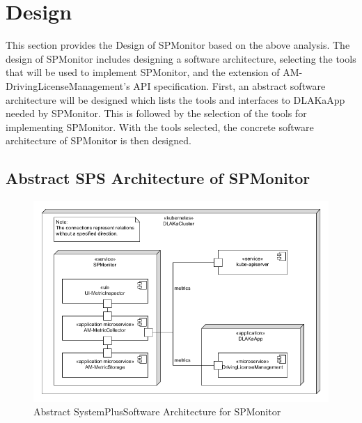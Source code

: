 \section{Design}
\label{sec:design}

This section provides the Design of SPMonitor based on the above analysis.
The design of SPMonitor includes designing a software architecture,
selecting the tools that will be used to implement SPMonitor, and
the extension of AM-DrivingLicenseManagement's API specification.
First, an abstract software architecture will be designed which lists
the tools and interfaces to DLAKaApp needed by SPMonitor.
This is followed by the selection of the tools for implementing SPMonitor.
With the tools selected, the concrete software architecture of SPMonitor is then designed.

\subsection{Abstract SPS Architecture of SPMonitor}

\begin{figure}[tb]
  \centering
  \includegraphics[width=\textwidth]{figures/abstract_sps_spmonitor.png}
  \caption{Abstract SystemPlusSoftware Architecture for SPMonitor}
  \label{fig:abstract_sps_spmonitor}
\end{figure}

